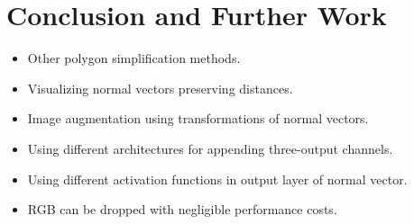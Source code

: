\chapter*{Conclusion and Further Work}

\begin{itemize}
  \item Other polygon simplification methods.
  \item Visualizing normal vectors preserving distances.
  \item Image augmentation using transformations of normal vectors.
  \item Using different architectures for appending three-output channels.
  \item Using different activation functions in output layer of normal vector.
  \item RGB can be dropped with negligible performance costs.
\end{itemize}
